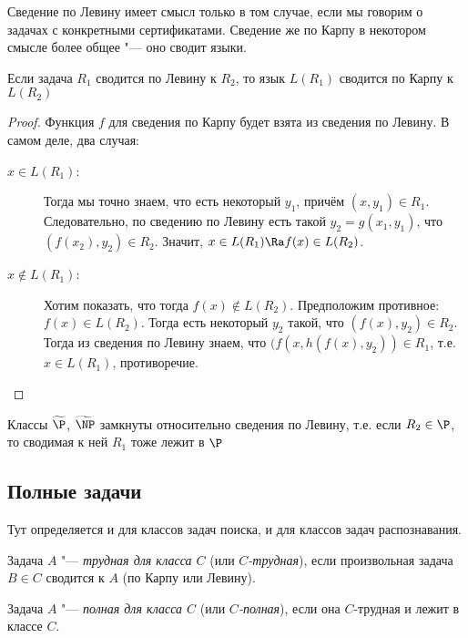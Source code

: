 	\begin{Rem}
		Сведение по Левину имеет смысл только в том случае, если мы говорим о задачах с конкретными сертификатами.
		Сведение же по Карпу в некотором смысле более общее "--- оно сводит языки.
	\end{Rem}
	\begin{assertion}
		Если задача $R_1$ сводится по Левину к $R_2$, то язык $L(R_1)$ сводится по Карпу к $L(R_2)$
	\end{assertion}
	\begin{proof}
		Функция $f$ для сведения по Карпу будет взята из сведения по Левину.
		В самом деле, два случая:
		\begin{description}
			\item[$x \in L(R_1)$:]
				Тогда мы точно знаем, что есть некоторый $y_1$, причём $(x, y_1) \in R_1$.
				Следовательно, по сведению по Левину есть такой $y_2=g(x_1, y_1)$, что $(f(x_2), y_2) \in R_2$.
				Значит, $x \in L(R_1) \Ra f(x) \in L(R_2)$.
			\item[$x \notin L(R_1)$:]
				Хотим показать, что тогда $f(x) \notin L(R_2)$.
				Предположим противное: $f(x) \in L(R_2)$.
				Тогда есть некоторый $y_2$ такой, что $(f(x), y_2) \in R_2$.
				Тогда из сведения по Левину знаем, что $(f(x, h(f(x), y_2)) \in R_1$, т.е. $x \in L(R_1)$,
				противоречие.
		\end{description}
	\end{proof}

	\begin{assertion}
		Классы $\widetilde{\P}$, $\widetilde{\NP}$ замкнуты относительно сведения по Левину, т.е. если $R_2 \in \P$, то сводимая к ней $R_1$ тоже лежит в $\P$
	\end{assertion}

\subsection{Полные задачи}
	Тут определяется и для классов задач поиска, и для классов задач распознавания.

	\begin{Def}
		Задача $A$ "--- \textit{трудная для класса $C$} (или \textit{$C$-трудная}), если произвольная задача $B \in C$ сводится к $A$ (по Карпу или Левину).
	\end{Def}
	\begin{Def}
		Задача $A$ "--- \textit{полная для класса $C$} (или \textit{$C$-полная}), если она $C$-трудная и лежит в классе $C$.
	\end{Def}

